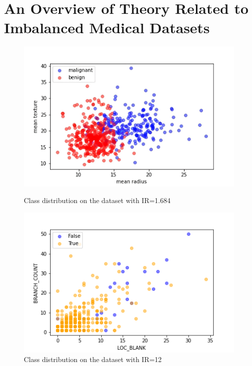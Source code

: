 \section{An Overview of Theory Related to Imbalanced Medical Datasets}
\begin{figure}[h]
    \centering 
    \begin{minipage}{0.45\textwidth}
        \includegraphics[width=\textwidth]{images/fig1}
        \caption{Class distribution on the dataset with IR=1.684}
        \label{fig1}
    \end{minipage}
    \quad
    \begin{minipage}{0.45\textwidth}
        \includegraphics[width=\textwidth]{images/fig2}
        \caption{Class distribution on the dataset with IR=12}
        \label{fig2}
    \end{minipage}
\end{figure}

